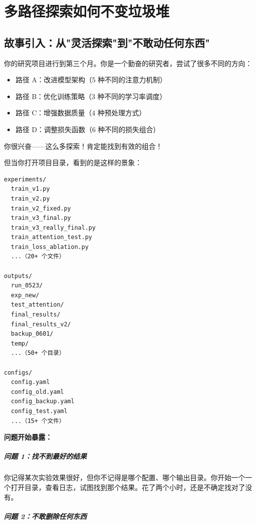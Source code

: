 \chapter{多路径探索如何不变垃圾堆}
\label{ch:multi_path}

\section{故事引入：从"灵活探索"到"不敢动任何东西"}

你的研究项目进行到第三个月。你是一个勤奋的研究者，尝试了很多不同的方向：

\begin{itemize}
  \item 路径 A：改进模型架构（5 种不同的注意力机制）
  \item 路径 B：优化训练策略（3 种不同的学习率调度）
  \item 路径 C：增强数据质量（4 种预处理方式）
  \item 路径 D：调整损失函数（6 种不同的损失组合）
\end{itemize}

你很兴奋——这么多探索！肯定能找到有效的组合！

但当你打开项目目录，看到的是这样的景象：

\begin{verbatim}
experiments/
  train_v1.py
  train_v2.py
  train_v2_fixed.py
  train_v3_final.py
  train_v3_really_final.py
  train_attention_test.py
  train_loss_ablation.py
  ...（20+ 个文件）

outputs/
  run_0523/
  exp_new/
  test_attention/
  final_results/
  final_results_v2/
  backup_0601/
  temp/
  ...（50+ 个目录）

configs/
  config.yaml
  config_old.yaml
  config_backup.yaml
  config_test.yaml
  ...（15+ 个文件）
\end{verbatim}

\textbf{问题开始暴露：}

\paragraph{问题 1：找不到最好的结果}

你记得某次实验效果很好，但你不记得是哪个配置、哪个输出目录。你开始一个一个打开目录，查看日志，试图找到那个结果。花了两个小时，还是不确定找对了没有。

\paragraph{问题 2：不敢删除任何东西}

